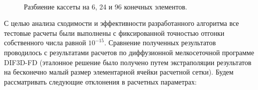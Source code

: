 \begin{figure}[H]
\begin{minipage}[H]{0.30\linewidth}
\end{minipage}
\hfill
\begin{minipage}[H]{0.30\linewidth}
\\
\end{minipage}
\caption{Разбиение кассеты на 6, 24 и 96 конечных элементов.}
\label{ris:iaea_mesh}
\end{figure}
С целью анализа сходимости и эффективности разработанного алгоритма все тестовые расчеты были выполнены с фиксированной точностью отгонки собственного числа равной $10^{-15}$. Сравнение полученных результатов проводилось с результатами расчетов по
диффузионной мелкосеточной программе DIF3D-FD\cite{chao} (эталонное решение было
получено путем экстраполяции результатов на бесконечно малый размер
элементарной ячейки расчетной сетки).
Будем рассматривать следующие отклонения в расчетных параметрах:
